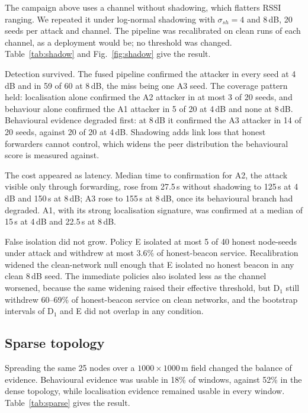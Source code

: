 The campaign above uses a channel without shadowing, which flatters RSSI
ranging. We repeated it under log-normal shadowing with $\sigma_{sh} = 4$ and
8\,dB, 20 seeds per attack and channel. The pipeline was recalibrated on clean
runs of each channel, as a deployment would be; no threshold was changed.
Table~\ref{tab:shadow} and Fig.~\ref{fig:shadow} give the result.

Detection survived. The fused pipeline confirmed the attacker in every seed at
4\,dB and in 59 of 60 at 8\,dB, the miss being one A3 seed. The coverage
pattern held: localisation alone confirmed the A2 attacker in at most 3 of 20
seeds, and behaviour alone confirmed the A1 attacker in 5 of 20 at 4\,dB and
none at 8\,dB. Behavioural evidence degraded first: at 8\,dB it confirmed the
A3 attacker in 14 of 20 seeds, against 20 of 20 at 4\,dB. Shadowing adds link
loss that honest forwarders cannot control, which widens the peer distribution
the behavioural score is measured against.

The cost appeared as latency. Median time to confirmation for A2, the attack
visible only through forwarding, rose from 27.5\,s without shadowing to
125\,s at 4\,dB and 150\,s at 8\,dB; A3 rose to 155\,s at 8\,dB, once its
behavioural branch had degraded. A1, with its strong localisation signature,
was confirmed at a median of 15\,s at 4\,dB and 22.5\,s at 8\,dB.

False isolation did not grow. Policy E isolated at most 5 of 40 honest
node-seeds under attack and withdrew at most 3.6\% of honest-beacon service.
Recalibration widened the clean-network null enough that E isolated no honest
beacon in any clean 8\,dB seed. The immediate policies also isolated less as
the channel worsened, because the same widening raised their effective
threshold, but D$_1$ still withdrew 60--69\% of honest-beacon service on clean
networks, and the bootstrap intervals of D$_1$ and E did not overlap in any
condition.

\subsection{Sparse topology}
\label{sec:sparse}

Spreading the same 25 nodes over a $1000 \times 1000$\,m field changed the
balance of evidence. Behavioural evidence was usable in 18\% of windows,
against 52\% in the dense topology, while localisation evidence remained
usable in every window. Table~\ref{tab:sparse} gives the result.

